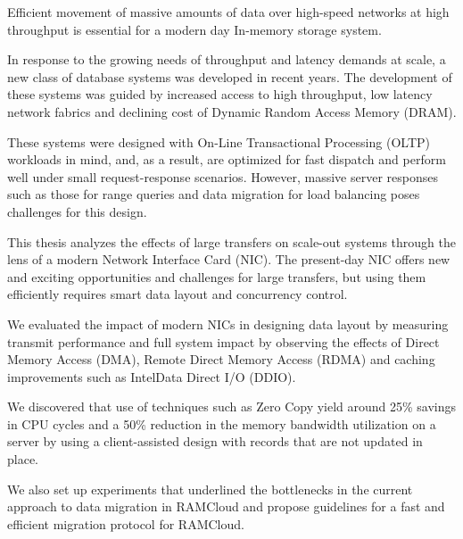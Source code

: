 


Efficient movement of massive amounts of data over high-speed networks at high 
throughput is essential for a modern day In-memory storage system.

In response to the growing needs of throughput and latency demands at scale, a new class of database systems was developed in recent years.
The development of these \linebreak systems was guided by increased access to high throughput, low latency network fabrics and declining cost of Dynamic Random Access Memory (DRAM).

These systems were designed with On-Line Transactional Processing (OLTP) \linebreak workloads in mind, and, as a result, are optimized for fast dispatch and perform well under small
request-response scenarios. However, massive server responses such as those for range queries and data migration for load balancing poses challenges for this design.  

This thesis analyzes the effects of large transfers on scale-out systems through the lens of a modern Network Interface Card (NIC).
The present-day NIC offers new and exciting opportunities and challenges for large transfers, but using them efficiently
 requires smart data layout and concurrency control.

We evaluated the impact of modern NICs in designing data layout by measuring \linebreak transmit 
performance and full system impact by observing the effects of Direct Memory Access (DMA), 
Remote Direct Memory Access (RDMA) and caching improvements such as Intel\textregistered Data Direct I/O (DDIO). 

We discovered that use of techniques such as Zero Copy yield around 25\% savings in CPU cycles and a 50\% reduction in the memory bandwidth utilization on a server
by using a client-assisted design with records that are not updated in place. 

We also set up experiments that underlined the bottlenecks in the current approach to data migration in RAMCloud and propose guidelines for a fast and efficient migration protocol for RAMCloud.
